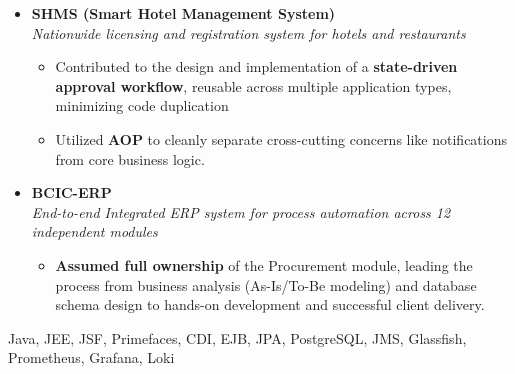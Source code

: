 \begin{experiences}
{\begin{itemize}[leftmargin=1.3em,label={}]
      \vspace{0.3em}
        \item \textbf{SHMS (Smart Hotel Management System)} \\
        {\small\textit{Nationwide licensing and registration system for hotels and restaurants }}
        \begin{itemize}
          \item Contributed to the design and implementation of a \textbf{state-driven approval workflow}, reusable across multiple application types, minimizing code duplication
          \item Utilized \textbf{AOP} to cleanly separate cross-cutting concerns like notifications from core business logic.
        \end{itemize}

      \vspace{0.3em}
        \item \textbf{BCIC-ERP} \\
        {\small\textit{End-to-end Integrated ERP system for process automation across 12 independent modules}}
        \begin{itemize}
          \item \textbf{Assumed full ownership} of the Procurement module, leading the process from business analysis (As-Is/To-Be modeling) and database schema design to hands-on development and successful client delivery.
        \end{itemize}
      \end{itemize}
    }
    {Java, JEE, JSF, Primefaces, CDI, EJB, JPA, PostgreSQL, JMS, Glassfish, Prometheus, Grafana, Loki}
  \emptySeparator
\end{experiences}

